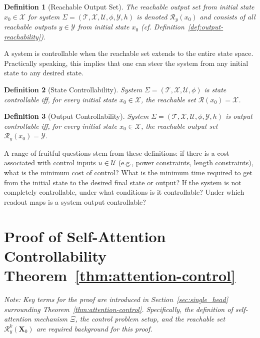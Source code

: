 \documentclass{article} %
\newtheorem{definition}{Definition}
\begin{document}
\begin{definition}[Reachable Output Set]
\label{def:reachable-output-set}
The reachable output set from initial state $x_0 \in \mathcal X$ for system $\Sigma = (\mathcal{T, X, U}, \phi, \mathcal Y, h)$ is denoted $\mathcal R_y(x_0)$ and consists of all reachable outputs $y\in \mathcal Y$ from initial state $x_0$ (cf. Definition~\ref{def:output-reachability}). 
\end{definition}




A system is controllable when the reachable set extends to the entire state space. Practically speaking, this implies that one can steer the system from any initial state to any desired state. 

\begin{definition}[State Controllability]
\label{def:state-controllability} 
System $\Sigma = (\mathcal{T, X, U}, \phi)$ is state controllable iff, for every initial state $x_0\in \mathcal X$, the reachable set $\mathcal R(x_0) = \mathcal X$.
\end{definition}

\begin{definition}[Output Controllability] 
\label{def:output-controllability}
System $\Sigma = (\mathcal{T, X, U}, \phi, \mathcal Y, h)$ is output controllable iff, for every initial state $x_0\in \mathcal X$, the reachable output set $\mathcal R_y(x_0) = \mathcal Y$.
\end{definition}


A range of fruitful questions stem from these definitions: if there is a cost associated with control inputs $u\in \mathcal U$ (e.g., power constraints, length constraints), what is the minimum cost of control? What is the minimum time required to get from the initial state to the desired final state or output? If the system is not completely controllable, under what conditions is it controllable? Under which readout maps is a system output controllable? 















\newpage
\section{Proof of Self-Attention Controllability Theorem~\ref{thm:attention-control}}
\label{app:proof-control-llms}
\textit{Note: Key terms for the proof are introduced in Section~\ref{sec:single_head} surrounding Theorem~\ref{thm:attention-control}. Specifically, the definition of self-attention mechanism $\Xi$, the control problem setup, and the reachable set $\mathcal R_y^k(\mathbf X_0)$ are required background for this proof.}
\end{document}
